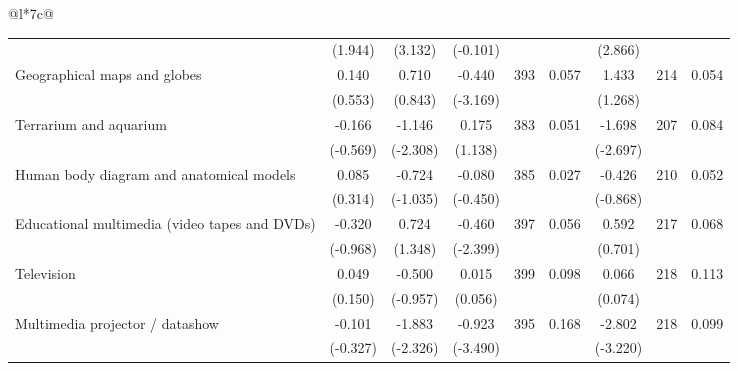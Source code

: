 \documentclass[a4paper, 12pt]{article}
\newcommand{\sym}[1]{\rlap{#1}}%
\begin{document}
\begin{longtable}{@{\extracolsep{1pt}}l*{7}{c}@{}}
\begin{adjustbox}{max width=\textwidth}
\begin{tabular}{l*{8}{c}}
            &     (1.944)         &     (3.132)         &     (-0.101)         &              &        &     (2.866)                \\
Geographical maps and globes     &       0.140         &       0.710         &      -0.440\sym{**} &    393         &      0.057     &       1.433         &       214        &        0.054    \\
            &     (0.553)         &     (0.843)         &     (-3.169)         &             &        &     (1.268)                \\
Terrarium and aquarium     &      -0.166         &      -1.146\sym{*}  &       0.175         &   383     &   0.051       &       -1.698\sym{**}         &       207        &        0.084     \\
            &     (-0.569)         &     (-2.308)         &     (1.138)         &              &       &     (-2.697)                 \\
Human body diagram and anatomical models     &      0.085         &      -0.724         &     -0.080         &     385         &     0.027     &      -0.426         &       210        &        0.052    \\
            &     (0.314)         &     (-1.035)         &     (-0.450)         &             &         &     (-0.868)               \\
Educational multimedia (video tapes and DVDs)     &      -0.320         &       0.724         &      -0.460\sym{*}  &     397         &     0.056    &       0.592         &       217        &        0.068     \\
            &     (-0.968)         &     (1.348)         &     (-2.399)         &              &       &     (0.701)                 \\
Television     &      0.049         &      -0.500         &      0.015         &     399         &      0.098        &       0.066         &       218        &   0.113      \\
            &     (0.150)         &     (-0.957)         &     (0.056)         &              &      &     (0.074)                  \\
Multimedia projector / datashow     &      -0.101         &      -1.883\sym{*}  &      -0.923\sym{***}&       395         &      0.168     &       -2.802\sym{**}         &       218        &        0.099    \\
            &     (-0.327)         &     (-2.326)         &     (-3.490)         &             &       &     (-3.220)                 \\

\end{tabular}
\end{adjustbox}
\end{longtable}
\end{document}
